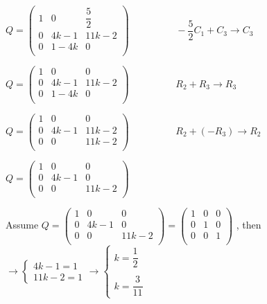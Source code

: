 \documentclass[fleqn]{article}
\begin{document}
\begin{enumerate}
      \textcolor{hwColor}{
        $
          Q=\begin{pmatrix}
          1 & 0 & \dfrac{5}{2} \\
          0 & 4k-1 & 11k-2 \\
          0 & 1-4k & 0 \\
        \end{pmatrix}
        \hspace{2cm} -\dfrac{5}{2}C_1+C_3 \longrightarrow C_3
        $
      }

      \textcolor{hwColor}{
        $
          Q=\begin{pmatrix}
          1 & 0 & 0 \\
          0 & 4k-1 & 11k-2 \\
          0 & 1-4k & 0 \\
        \end{pmatrix}
        \hspace{2cm} R_2+R_3 \longrightarrow R_3
        $
      }

      \textcolor{hwColor}{
        $
          Q=\begin{pmatrix}
          1 & 0 & 0 \\
          0 & 4k-1 & 11k-2 \\
          0 & 0 & 11k-2 \\
        \end{pmatrix}
        \hspace{2cm} R_2+(-R_3) \longrightarrow R_2
        $
      }

      \textcolor{hwColor}{
        $
          Q=\begin{pmatrix}
          1 & 0 & 0 \\
          0 & 4k-1 & 0 \\
          0 & 0 & 11k-2 \\
        \end{pmatrix}
        $
      }

      \textcolor{hwColor}{
        Assume
        $
          Q=\begin{pmatrix}
          1 & 0 & 0 \\
          0 & 4k-1 & 0 \\
          0 & 0 & 11k-2 \\
        \end{pmatrix}=\begin{pmatrix}
          1 & 0 & 0 \\
          0 & 1 & 0 \\
          0 & 0 & 1 \\
        \end{pmatrix}
        $
        , then 
        $
         \longrightarrow
         \begin{cases}
           4k-1=1 \\
           11k-2=1  
         \end{cases}
         \longrightarrow
         \begin{cases}
           k=\dfrac{1}{2} \\
           \\
           k= \dfrac{3}{11} 
         \end{cases}
        $
      }


\end{enumerate}
\end{document}
